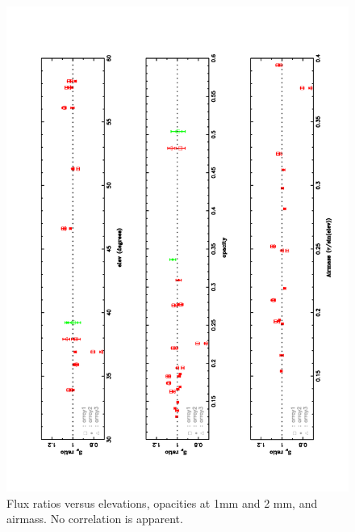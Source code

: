 \begin{figure}
\begin{center}
  \includegraphics[clip, angle=-90, scale=0.6]{Figures/U_N_versus.pdf}
  \caption{Flux ratios versus elevations, opacities at 1mm and 2 mm, and airmass. No correlation is
    apparent.   }
\label{fig:U_N_versus}
\end{center}
\end{figure}






